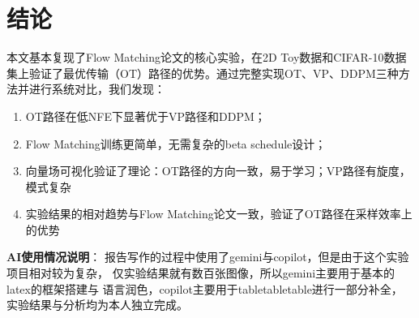 \documentclass[11pt,a4paper]{article}
\begin{document}
\section{结论}
\label{sec:conclusion}

本文基本复现了Flow Matching论文的核心实验，在2D Toy数据和CIFAR-10数据集上验证了最优传输（OT）路径的优势。通过完整实现OT、VP、DDPM三种方法并进行系统对比，我们发现：

\begin{enumerate}
\item OT路径在低NFE下显著优于VP路径和DDPM；
\item Flow Matching训练更简单，无需复杂的beta schedule设计；
\item 向量场可视化验证了理论：OT路径的方向一致，易于学习；VP路径有旋度，模式复杂
\item 实验结果的相对趋势与Flow Matching论文一致，验证了OT路径在采样效率上的优势
\end{enumerate}





\textbf{AI使用情况说明}：
报告写作的过程中使用了gemini与copilot，但是由于这个实验项目相对较为复杂，
仅实验结果就有数百张图像，所以gemini主要用于基本的latex的框架搭建与
语言润色，copilot主要用于tabletabletable进行一部分补全，
实验结果与分析均为本人独立完成。
\end{document}

